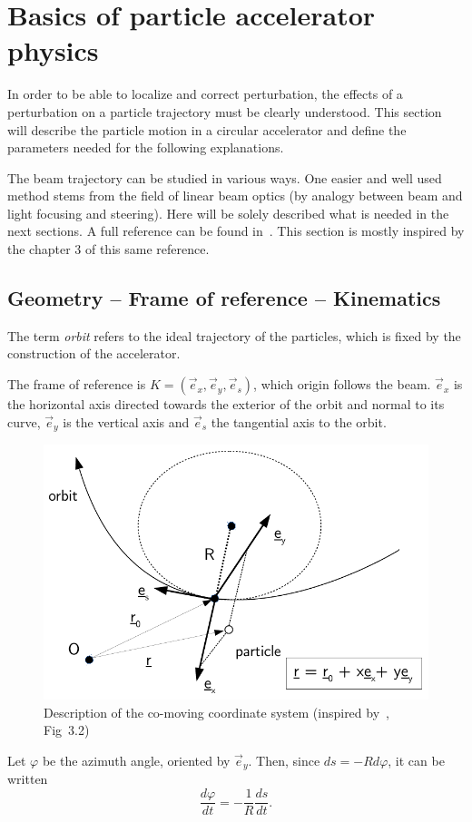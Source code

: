 
\chapter{Basics of particle accelerator physics}
\label{sec:acc_physics}
In order to be able to localize and correct perturbation, the effects of a perturbation on a particle trajectory must be clearly understood. This section will describe the particle motion in a circular accelerator and define the parameters needed for the following explanations.

The beam trajectory can be studied in various ways. One easier and well used method stems from the field of linear beam optics (by analogy between beam and light focusing and steering). Here will be solely described what is needed in the next sections. A full reference can be found in~\cite{book:wille}. This section is mostly inspired by the chapter 3 of this same reference.

\section{Geometry -- Frame of reference -- Kinematics}
The term \emph{orbit} refers to the ideal trajectory of the particles, which is fixed by the construction of the accelerator.

The frame of reference is $K=(\vec{e}_x,\vec{e}_y, \vec{e}_s)$, which origin follows the beam. $\vec{e}_x$ is the horizontal axis directed towards the exterior of the orbit and normal to its curve, $\vec{e}_y$ is the vertical axis and $\vec{e}_s$ the tangential axis to the orbit.
\begin{figure}
    \centering
    \includegraphics[width=0.8\linewidth]{img/orbit_coordinates.pdf}
    \caption[Description of the co-moving coordinate system]{\label{fig:coordinate system}Description of the co-moving coordinate system (inspired by~\cite{book:wille}, Fig~3.2)}
\end{figure}
Let $\varphi$ be the azimuth angle, oriented by $\vec{e}_y$. Then, since $ds = -R d\varphi$, it can be written
\begin{equation}
\frac{d \varphi}{d t}  = -\frac{1}{R} \frac{d s}{d t}.
\end{equation}

